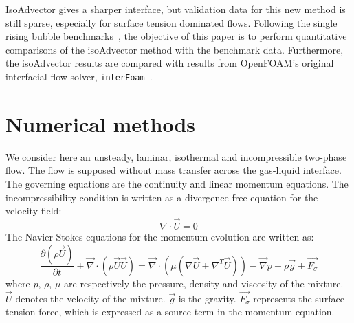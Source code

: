 \documentclass[review]{elsarticle}
\begin{document}
IsoAdvector gives a sharper interface, but validation data for this new method is still sparse, especially for surface tension dominated flows. Following the single rising bubble benchmarks~\cite{Hysing2009,Adelsberger2014}, the objective of this paper is to perform quantitative comparisons of the isoAdvector method with the benchmark data. Furthermore, the isoAdvector results are compared with results from OpenFOAM's original interfacial flow solver, \verb+interFoam+~\cite{Weller2008}.

\section{Numerical methods}\label{sec_nummethods}
We consider here an unsteady, laminar, isothermal and incompressible two-phase flow. The flow is supposed without mass transfer across the gas-liquid interface. The governing equations are the continuity and linear momentum equations. The incompressibility condition is written as a divergence free equation for the velocity field:
\begin{equation}
  \nabla \cdot \overrightarrow{U} = 0
\label{diveqn}
\end{equation}
The Navier-Stokes equations for the momentum evolution are written as: 
\begin{equation}
  \frac{\partial(\rho \overrightarrow{U})}{\partial t} + 
  \overrightarrow{\nabla} \cdot (\rho\overrightarrow{U}\overrightarrow{U}) = 
  \overrightarrow{\nabla} \cdot \left( \mu (\nabla\overrightarrow{U}+\nabla^T\overrightarrow{U})\right)
  - \overrightarrow{\nabla} p + \rho \overrightarrow{g} + \overrightarrow{F_{\sigma}}
\label{NSeqns}
\end{equation}
where $p$, $\rho$, $\mu$ are respectively the pressure, density and viscosity of the mixture. $\overrightarrow{U}$ denotes the velocity of the mixture. $\overrightarrow{g}$ is the gravity. $\overrightarrow{F_{\sigma}}$ represents the surface tension force, which is expressed as a source term in the momentum equation. 
\end{document}
